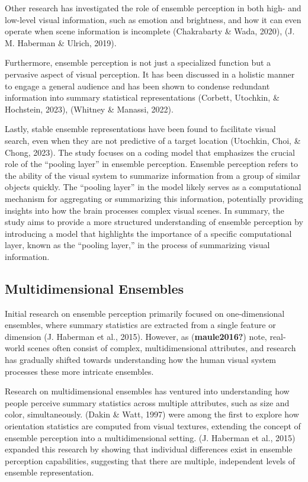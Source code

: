 \documentclass[print]{nuthesis}
\begin{document}
Other research has investigated the role of ensemble perception in both high- and low-level visual information, such as emotion and brightness, and how it can even operate when scene information is incomplete (Chakrabarty \& Wada, 2020), (J. M. Haberman \& Ulrich, 2019).

Furthermore, ensemble perception is not just a specialized function but a pervasive aspect of visual perception.
It has been discussed in a holistic manner to engage a general audience and has been shown to condense redundant information into summary statistical representations (Corbett, Utochkin, \& Hochstein, 2023), (Whitney \& Manassi, 2022).

Lastly, stable ensemble representations have been found to facilitate visual search, even when they are not predictive of a target location (Utochkin, Choi, \& Chong, 2023).
The study focuses on a coding model that emphasizes the crucial role of the ``pooling layer'' in ensemble perception.
Ensemble perception refers to the ability of the visual system to summarize information from a group of similar objects quickly.
The ``pooling layer'' in the model likely serves as a computational mechanism for aggregating or summarizing this information, potentially providing insights into how the brain processes complex visual scenes.
In summary, the study aims to provide a more structured understanding of ensemble perception by introducing a model that highlights the importance of a specific computational layer, known as the ``pooling layer,'' in the process of summarizing visual information.

\hypertarget{multidimensional-ensembles}{%
\subsection{Multidimensional Ensembles}\label{multidimensional-ensembles}}

Initial research on ensemble perception primarily focused on one-dimensional ensembles, where summary statistics are extracted from a single feature or dimension (J. Haberman et al., 2015).
However, as (\textbf{maule2016?}) note, real-world scenes often consist of complex, multidimensional attributes, and research has gradually shifted towards understanding how the human visual system processes these more intricate ensembles.

Research on multidimensional ensembles has ventured into understanding how people perceive summary statistics across multiple attributes, such as size and color, simultaneously.
(Dakin \& Watt, 1997) were among the first to explore how orientation statistics are computed from visual textures, extending the concept of ensemble perception into a multidimensional setting.
(J. Haberman et al., 2015) expanded this research by showing that individual differences exist in ensemble perception capabilities, suggesting that there are multiple, independent levels of ensemble representation.
\end{document}
